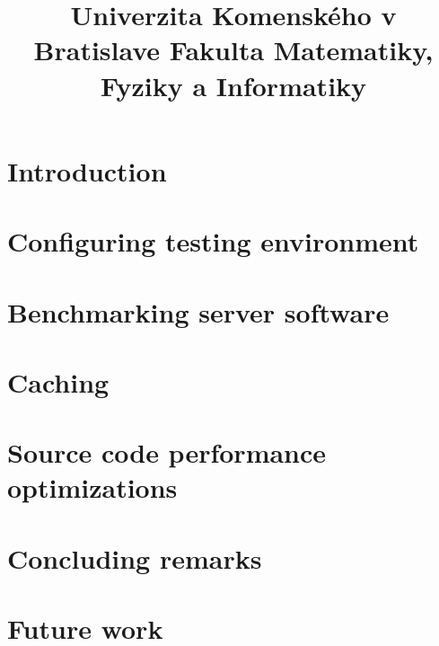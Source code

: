 \documentclass[12pt,a4paper]{bachelor}
\title{Univerzita Komenského v Bratislave Fakulta Matematiky, Fyziky a Informatiky}
\author{\autor}
\begin{document}



\printglossaries


\tableofcontents
\listoffigures
\listoftables

\newpage


\chapter{Introduction}


\chapter{Configuring testing environment}


\chapter{Benchmarking server software}


\chapter{Caching}


\chapter{Source code performance optimizations}


\chapter{Concluding remarks}


\chapter{Future work}


\printbibliography



\label{totalpages}
\end{document}
